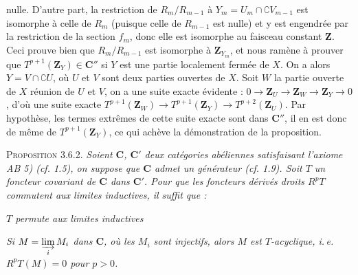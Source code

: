 
\noindent nulle. D'autre part, la restriction de $R_m/R_{m-1}$ à
$Y_m=U_m\cap \complement V_{m-1}$ est isomorphe à celle de $R_m$ (puisque
celle de $R_{m-1}$ est nulle) et y est engendrée par la restriction de la
section $f_m$, donc elle est isomorphe au faisceau constant $\mathbf Z$.
Ceci prouve bien que $R_m/R_{m-1}$ est isomorphe à $\mathbf Z_{Y_m}$, et nous ramène
à prouver que $T^{p+1}(\mathbf Z_Y)\in \mathbf C''$ si $Y$ est une partie localement fermée
de $X$. On a alors $Y=V\cap \complement U$, où $U$ et $V$ sont deux parties
ouvertes de $X$. Soit $W$ la partie ouverte de $X$ réunion de $U$ et $V$, on
a une suite exacte évidente :
$0\to \mathbf Z_U\to \mathbf Z_W\to \mathbf Z_Y\to0$,
d'où une suite exacte
$T^{p+1}(\mathbf Z_W)\to T^{p+1}(\mathbf Z_Y)\to T^{p+2}(\mathbf Z_U)$.
Par hypothèse, les termes extrêmes de cette suite exacte sont dans $\mathbf C''$, il
en est donc de même de $T^{p+1}(\mathbf Z_Y)$, ce qui achève la démonstration de la
proposition.

\indent\textsc{Proposition 3.6.2.} \textit{Soient $\mathbf C$, $\mathbf C'$ deux
catégories abéliennes satisfaisant l'axiome \textup{AB 5) (}cf. \textup{1.5)}, on suppose que
$\mathbf C$ admet un générateur \textup{(}cf. \textup{1.9)}. Soit $T$ un foncteur covariant de $\mathbf C$ dans
$\mathbf C'$. Pour que les foncteurs dérivés droits $R^pT$ commutent aux limites
inductives, il suffit que :}
\begin{description}
\item[\textnormal{\textit{a})}] \textit{$T$ permute aux limites inductives}
\item[\textnormal{\textit{b})}] \textit{Si $M=\varinjlim\limits_i M_i$ dans $\mathbf C$, où les $M_i$
sont injectifs, alors $M$ est $T$-acyclique, i.\,e.
$R^pT(M)=0$ pour $p>0$.}
\end{description}


